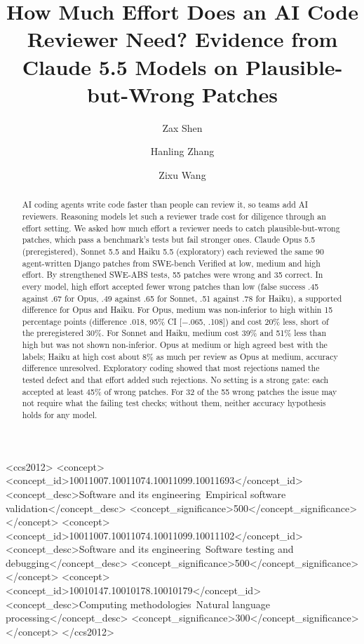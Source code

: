 \documentclass[sigconf,nonacm]{acmart}
\title[How Much Effort Does an AI Code Reviewer Need?]{How Much Effort Does an AI Code Reviewer Need? Evidence from Claude 5.5 Models on Plausible-but-Wrong Patches}
\author{Zax Shen}
\affiliation{%
  \institution{Trust My Bot}
  \city{Los Angeles}
  \state{California}
  \country{USA}}
\author{Hanling Zhang}
\affiliation{%
  \institution{Trust My Bot}
  \city{Hong Kong}
  \country{Hong Kong}}
\author{Zixu Wang}
\affiliation{%
  \institution{Independent Researcher}
  \city{Orlando}
  \state{Florida}
  \country{USA}}
\begin{document}
\begin{abstract}
AI coding agents write code faster than people can review it, so teams add AI reviewers. Reasoning models let such a reviewer trade cost for diligence through an effort setting. We asked how much effort a reviewer needs to catch plausible-but-wrong patches, which pass a benchmark's tests but fail stronger ones. Claude Opus 5.5 (preregistered), Sonnet 5.5 and Haiku 5.5 (exploratory) each reviewed the same 90 agent-written Django patches from SWE-bench Verified at low, medium and high effort. By strengthened SWE-ABS tests, 55 patches were wrong and 35 correct. In every model, high effort accepted fewer wrong patches than low (false success .45 against .67 for Opus, .49 against .65 for Sonnet, .51 against .78 for Haiku), a supported difference for Opus and Haiku. For Opus, medium was non-inferior to high within 15 percentage points (difference .018, 95\% CI [$-$.065, .108]) and cost 20\% less, short of the preregistered 30\%. For Sonnet and Haiku, medium cost 39\% and 51\% less than high but was not shown non-inferior. Opus at medium or high agreed best with the labels; Haiku at high cost about 8\% as much per review as Opus at medium, accuracy difference unresolved. Exploratory coding showed that most rejections named the tested defect and that effort added such rejections. No setting is a strong gate: each accepted at least 45\% of wrong patches. For 32 of the 55 wrong patches the issue may not require what the failing test checks; without them, neither accuracy hypothesis holds for any model.
\end{abstract}

\begin{CCSXML}
<ccs2012>
<concept>
<concept_id>10011007.10011074.10011099.10011693</concept_id>
<concept_desc>Software and its engineering~Empirical software validation</concept_desc>
<concept_significance>500</concept_significance>
</concept>
<concept>
<concept_id>10011007.10011074.10011099.10011102</concept_id>
<concept_desc>Software and its engineering~Software testing and debugging</concept_desc>
<concept_significance>500</concept_significance>
</concept>
<concept>
<concept_id>10010147.10010178.10010179</concept_id>
<concept_desc>Computing methodologies~Natural language processing</concept_desc>
<concept_significance>300</concept_significance>
</concept>
</ccs2012>
\end{CCSXML}

\end{document}
